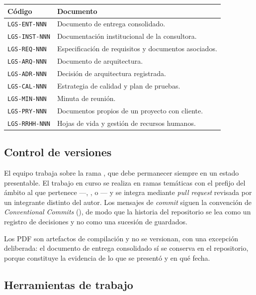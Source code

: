 \begin{center}
\begin{tabularx}{\linewidth}{@{}L{3.2cm} Y@{}}
\toprule
\sffamily\bfseries\color{lgPrimario}Código &
\sffamily\bfseries\color{lgPrimario}Documento \\
\midrule
\texttt{LGS-ENT-NNN} & Documento de entrega consolidado. \\
\texttt{LGS-INST-NNN} & Documentación institucional de la consultora. \\
\texttt{LGS-REQ-NNN} & Especificación de requisitos y documentos asociados. \\
\texttt{LGS-ARQ-NNN} & Documento de arquitectura. \\
\texttt{LGS-ADR-NNN} & Decisión de arquitectura registrada. \\
\texttt{LGS-CAL-NNN} & Estrategia de calidad y plan de pruebas. \\
\texttt{LGS-MIN-NNN} & Minuta de reunión. \\
\texttt{LGS-PRY-NNN} & Documentos propios de un proyecto con cliente. \\
\texttt{LGS-RRHH-NNN} & Hojas de vida y gestión de recursos humanos. \\
\bottomrule
\end{tabularx}
\end{center}

\subsection{Control de versiones}

El equipo trabaja sobre la rama , que debe permanecer siempre en un
estado presentable. El trabajo en curso se realiza en ramas temáticas con el
prefijo del ámbito al que pertenece —, ,  o
— y se integra mediante \emph{pull request} revisada por un
integrante distinto del autor. Los mensajes de \emph{commit} siguen la convención
de \emph{Conventional Commits} (), de modo
que la historia del repositorio se lea como un registro de decisiones y no como
una sucesión de guardados.

Los PDF son artefactos de compilación y no se versionan, con una excepción
deliberada: el documento de entrega consolidado sí se conserva en el repositorio,
porque constituye la evidencia de lo que se presentó y en qué fecha.

\subsection{Herramientas de trabajo}

